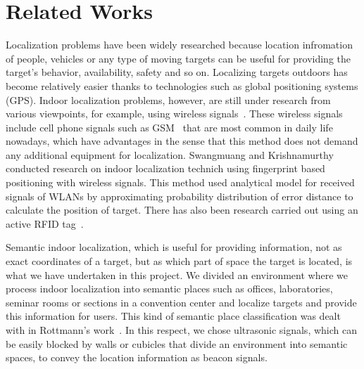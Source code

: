 \section{Related Works}
\label{sec:related-works}


Localization problems have been widely researched because location infromation of people, vehicles or any type of moving targets can be useful for providing the target's behavior, availability, safety and so on. Localizing targets outdoors has become relatively easier thanks to technologies such as global positioning systems (GPS). Indoor localization problems, however, are still under research from various viewpoints, for example, using wireless signals~\cite{liu2007}. These wireless signals include cell phone signals such as GSM~\cite{otsason2005accurate} that are most common in daily life nowadays, which have advantages in the sense that this method does not demand any additional equipment for localization. Swangmuang and Krishnamurthy~\cite{Swangmuang2008} conducted research on indoor localization technich using fingerprint based positioning with wireless signals. This method used analytical model for received signals of WLANs by approximating probability distribution of error distance to calculate the position of target. There has also been research carried out using an active RFID tag~\cite{Jin2006}.

Semantic indoor localization, which is useful for providing information, not as exact coordinates of a target, but as which part of space the target is located, is what we have undertaken in this project. We divided an environment where we process indoor localization into semantic places such as offices, laboratories, seminar rooms or sections in a convention center and localize targets and provide this information for users. This kind of semantic place classification was dealt with in Rottmann's work~\cite{rottmann2005semantic}. In this respect, we chose ultrasonic signals, which can be easily blocked by walls or cubicles that divide an environment into semantic spaces, to convey the location information as beacon signals. 



